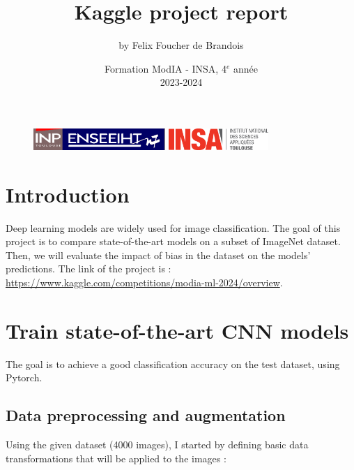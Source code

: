 \documentclass[12pt,a4paper]{article}
\begin{document}
\begin{figure}[t]
    \centering
    \includegraphics[width=5cm]{src/inp_n7.png}
    \hfill
    \includegraphics[width=3.8cm]{src/insa_toulouse.png}
\end{figure}

\title{\vspace{4cm} \textbf{Kaggle project report}}

\author{by Felix Foucher de Brandois}
        
\date{\vfill Formation ModIA - INSA, 4$^e$ année \\
2023-2024}

\maketitle

\newpage
\tableofcontents
\listoffigures

\newpage


\section{Introduction}
Deep learning models are widely used for image classification.
The goal of this project is to compare state-of-the-art models on a subset of ImageNet dataset.
Then, we will evaluate the impact of bias in the dataset on the models' predictions.
The link of the project is : \url{https://www.kaggle.com/competitions/modia-ml-2024/overview}.


\section{Train state-of-the-art CNN models}

The goal is to achieve a good classification accuracy on the test dataset, using Pytorch.

\subsection{Data preprocessing and augmentation}

Using the given dataset (4000 images), I started by defining basic data transformations that will be applied to the images :
\end{document}

